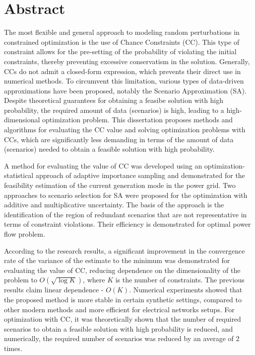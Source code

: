 \chapter*{Abstract}

The most flexible and general approach to modeling random perturbations in constrained optimization is the use of Chance Constraints (CC). This type of constraint allows for the pre-setting of the probability of violating the initial constraints, thereby preventing excessive conservatism in the solution. Generally, CCs do not admit a closed-form expression, which prevents their direct use in numerical methods. To circumvent this limitation, various types of data-driven approximations have been proposed, notably the Scenario Approximation (SA). Despite theoretical guarantees for obtaining a feasibe solution with high probability, the required amount of data (scenarios) is high, leading to a high-dimensional optimization problem. This dissertation proposes methods and algorithms for evaluating the CC value and solving optimization problems with CCs, which are significantly less demanding in terms of the amount of data (scenarios) needed to obtain a feasible solution with high probability.

A method for evaluating the value of CC was developed using an optimization-statistical approach of adaptive importance sampling and demonstrated for the feasibility estimation of the current generation mode in the power grid. Two approaches to scenario selection for SA were proposed for the optimization with additive and multiplicative uncertainty. The basis of the approach is the identification of the region of redundant scenarios that are not representative in terms of constraint violations. Their efficiency is demonstrated for optimal power flow problem.

According to the research results, a significant improvement in the convergence rate of the variance of the estimate to the minimum was demonstrated for evaluating the value of CC, reducing dependence on the dimensionality of the problem to $O(\sqrt{\log K})$, where 
$K$ is the number of constraints. The previous results claim linear dependence  - $O(K)$. Numerical experiments showed that the proposed method is more stable in certain synthetic settings, compared to other modern methods and more efficient for electrical networks setups. For optimization with CC, it was theoretically shown that the number of required scenarios to obtain a feasible solution with high probability is reduced, and numerically, the required number of scenarios was reduced by an average of 2 times.